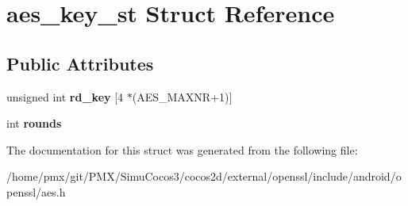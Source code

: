 \hypertarget{structaes__key__st}{}\section{aes\+\_\+key\+\_\+st Struct Reference}
\label{structaes__key__st}
\subsection*{Public Attributes}
\begin{DoxyCompactItemize}
\item 
\mbox{\label{structaes__key__st_a218276b6a04a63d4a4e75816501d2ec9}} 
unsigned int {\bfseries rd\+\_\+key} \mbox{[}4 $\ast$(A\+E\+S\+\_\+\+M\+A\+X\+NR+1)\mbox{]}
\item 
\mbox{\label{structaes__key__st_aa87061a8d8d0b11de2933ee88cb91f18}} 
int {\bfseries rounds}
\end{DoxyCompactItemize}


The documentation for this struct was generated from the following file\+:\begin{DoxyCompactItemize}
\item 
/home/pmx/git/\+P\+M\+X/\+Simu\+Cocos3/cocos2d/external/openssl/include/android/openssl/aes.\+h\end{DoxyCompactItemize}
